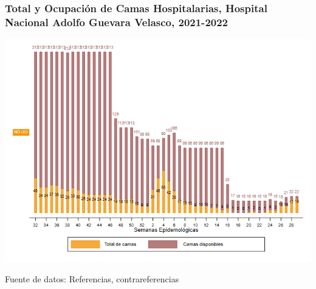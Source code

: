 \documentclass[xcolor=table]{beamer}
\begin{document}
	\begin{frame}
		\frametitle{Total y Ocupación de Camas Hospitalarias, Hospital Nacional Adolfo Guevara Velasco, 2021-2022}
		\vspace{-.2cm}
		\begin{center}
			\includegraphics[width=0.8\linewidth, trim={0cm .5cm 0cm 0.2cm},clip]{../figuras/h_adolfo_nouci.png}
			
			\begin{table}[]
			\end{table}
			
		\end{center}
		{\tiny Fuente de datos: Referencias, contrareferencias}
	\end{frame}
	
\end{document}
